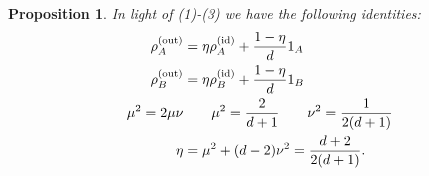 \documentclass[reqno]{amsart}
\newtheorem{proposition}{Proposition}
\numberwithin{lemma}{section}
\numberwithin{proposition}{section}
\newcommand{\out}{\textnormal{out}}
\newcommand{\id}{\textnormal{id}}
\begin{document}
\begin{proposition}
\label{UQCMidentities}
In light of (1)-(3) we have the following identities:
\begin{align}
\rho_{A}^{(\out)} &= \eta \rho_{A}^{(\id)} + \frac{1 - \eta}{d} 1_{A} \label{universal_rhoA}\\
\rho_{B}^{(\out)} &= \eta \rho_{B}^{(\id)} + \frac{1 - \eta}{d} 1_{B} \label{universal_rhoB}\\
\mu^{2} = 2\mu \nu  &\qquad \mu^{2} = \frac{2}{d+1}  \qquad \nu^{2} = \frac{1}{2(d+1)} \label{mu_nu_d}\\
\eta &= \mu^{2} + (d-2)\nu^{2} = \frac{d+2}{2(d+1)} \label{eta_universal_d}.
\end{align}
\end{proposition}

\end{document}
